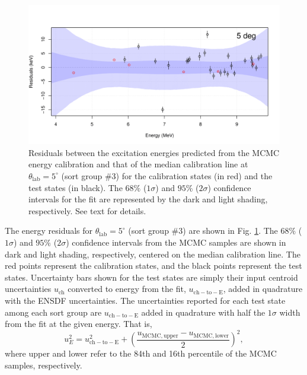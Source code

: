\begin{figure}[t]
\centering
\includegraphics[width=6.5in]{Chapter-6/figs/residuals-5deg.png}
\caption{\label{fig:residuals_5deg}Residuals between the excitation energies predicted from the MCMC energy calibration and that of the median calibration line at $\theta_{\mathrm{lab}} = 5^{\circ}$ (sort group $\#$3) for the calibration states (in red) and the test states (in black). The $68\%$ ($1\sigma$) and $95\%$ ($2\sigma$) confidence intervals for the fit are represented by the dark and light shading, respectively. See text for details.}
\end{figure}

The energy residuals for $\theta_{\mathrm{lab}} = 5^{\circ}$ (sort group $\#$3) are shown in Fig. \ref{fig:residuals_5deg}. The $68\%$ ($1\sigma$) and $95\%$ ($2\sigma$) confidence intervals from the MCMC samples are shown in dark and light shading, respectively, centered on the median calibration line. The red points represent the calibration states, and the black points represent the test states. Uncertainty bars shown for the test states are simply their input centroid uncertainties $u_{\mathrm{ch}}$ converted to energy from the fit, $u_{\mathrm{ch-to-E}}$, added in quadrature with the ENSDF uncertainties. The uncertainties reported for each test state among each sort group are $u_{\mathrm{ch-to-E}}$ added in quadrature with half the $1\sigma$ width from the fit at the given energy. That is,
\begin{equation}
u_{E}^{2} = u_{\mathrm{ch-to-E}}^{2} + \left( \frac{u_{\mathrm{MCMC, upper}} - u_{\mathrm{MCMC, lower}}}{2} \right)^{2},
\end{equation}
where upper and lower refer to the 84th and 16th percentile of the MCMC samples, respectively.


